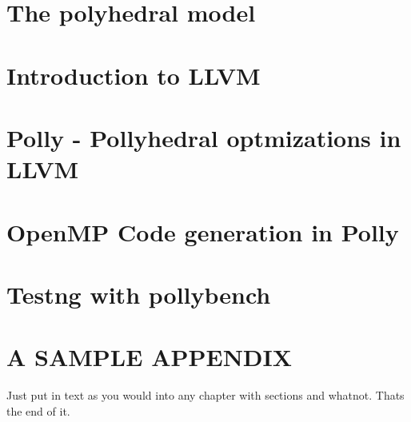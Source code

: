 \documentclass[MTech]{iitmdiss}
\begin{document}
 \chapter{The polyhedral model}


 \chapter{Introduction to LLVM}


\chapter{Polly - Pollyhedral optmizations in LLVM}


\chapter{OpenMP Code generation in Polly}


\chapter{Testng with pollybench}


%




\appendix
 
\chapter{A SAMPLE APPENDIX}
 
 Just put in text as you would into any chapter with sections and
 whatnot.  Thats the end of it.

\end{document}
